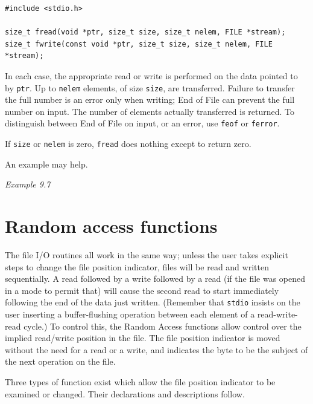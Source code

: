   \begin{Verbatim}
#include <stdio.h>

size_t fread(void *ptr, size_t size, size_t nelem, FILE *stream);
size_t fwrite(const void *ptr, size_t size, size_t nelem, FILE *stream);
\end{Verbatim}

  In each case, the appropriate read or write is performed  on the  data
   pointed to by \texttt{ptr}.  Up to \texttt{nelem} elements, of size
   \texttt{size}, are transferred.  Failure to transfer the full  number is
   an  error only when writing; End of File can prevent the full number on
   input.   The  number  of  elements  actually transferred is returned.  To
   distinguish between End of File on input, or an error, use \texttt{feof}
   or \texttt{ferror}.


  If \texttt{size} or \texttt{nelem} is  zero,  \texttt{fread}
   does  nothing  except  to return zero.


  An example may help.


  \begin{center}\textit{Example 9.7}\end{center}


 
        \section{Random access functions}
        

  

  The file I/O routines all work in the same way; unless the user takes
   explicit steps to change the file position indicator, files will be read and
   written sequentially.  A read followed by a write followed by a read (if the
   file was opened in a mode to permit that) will cause the second read to
   start immediately following the end of the data just written.  (Remember
   that \texttt{stdio} insists on the user inserting a buffer-flushing
   operation between each element of a read-write-read cycle.) To control this,
   the Random Access functions allow control over the implied read/write
   position in the file.  The file position indicator is moved without the need
   for a read or a write, and indicates the byte to be the subject of the next
   operation on the file.


  Three types of function exist which allow the file position indicator to
   be examined or changed.  Their declarations and descriptions follow.


